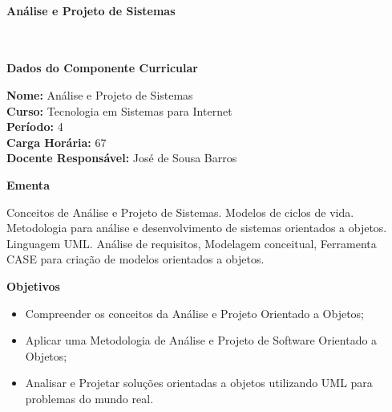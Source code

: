 \paragraph{Análise e Projeto de Sistemas} \


\begin{snugshade}\begin{center}\textbf{
	Dados do Componente Curricular
}\end{center}\end{snugshade}

\noindent 	\textbf{Nome:} Análise e Projeto de Sistemas
\\ 			\textbf{Curso:} Tecnologia em Sistemas para Internet
\\ 			\textbf{Período:} \unit{4}{\degree}
\\ 			\textbf{Carga Horária:} \unit{67}{\hour}
\\ 			\textbf{Docente Responsável:} José de Sousa Barros 


\begin{snugshade}\begin{center}\textbf{
    Ementa
\vphantom{q}}\end{center}\end{snugshade}

\noindent
Conceitos de Análise e Projeto de Sistemas. Modelos de ciclos de vida.  Metodologia para análise e desenvolvimento de sistemas orientados a objetos. Linguagem UML.  Análise de requisitos, Modelagem conceitual, Ferramenta CASE para criação de modelos orientados a objetos.


\begin{snugshade}\begin{center}\textbf{
    Objetivos
}\end{center}\end{snugshade}


\begin{itemize}

\item Compreender os conceitos da Análise e Projeto Orientado a Objetos;
\item Aplicar uma Metodologia de Análise e Projeto de Software Orientado a Objetos;
\item Analisar e Projetar soluções orientadas a objetos utilizando UML para problemas do mundo real.

\end{itemize} 

